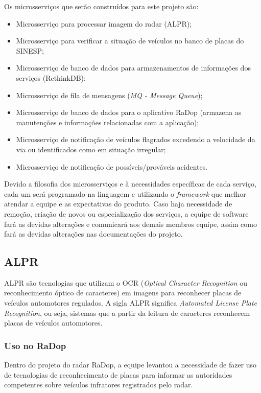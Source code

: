 Os microsserviços que serão construídos para este projeto são:

\begin{itemize}
    \item Microsserviço para processar imagem do radar (ALPR);
    \item Microsserviço para verificar a situação de veículos no banco de placas do SINESP;
    \item Microsserviço de banco de dados para armazenamentos de informações dos serviços (RethinkDB);
    \item Microsserviço de fila de mensagens (\textit{MQ - Message Queue});
    \item Microsserviço de banco de dados para o aplicativo RaDop (armazena as manutenções e informações relacionadas com a aplicação);
    \item Microsserviço de notificação de veículos flagrados excedendo a velocidade da via ou identificados como em situação irregular;
    \item Microsserviço de notificação de possíveis/prováveis acidentes.
\end{itemize}

Devido a filosofia dos microsserviços e à necessidades específicas de cada serviço, cada um será programado na linguagem e utilizando o \textit{framework} que melhor atendar a equipe e as expectativas do produto.  
Caso haja necessidade de remoção, criação de novos ou especialização dos serviços, a equipe de software fará as devidas alterações e comunicará aos demais membros equipe, assim como fará as devidas alterações nas documentações do projeto.

\subsection{ALPR}

ALPR são tecnologias que utilizam o OCR (\textit{Optical Character Recognition} ou reconhecimento óptico de caracteres) em imagens para reconhecer placas de veículos automotores regulados. A sigla ALPR significa \textit{Automated License Plate Recognition}, ou seja, sistemas que a partir da leitura de caracteres reconhecem placas de veículos automotores.

\subsubsection{Uso no RaDop}

Dentro do projeto do radar RaDop, a equipe levantou a necessidade de fazer uso de tecnologias de reconhecimento de placas para informar as autoridades competentes sobre veículos infratores registrados pelo radar.

